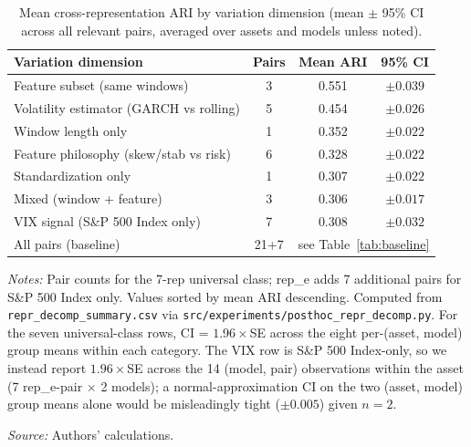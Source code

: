\documentclass[preprint,12pt,authoryear]{elsarticle}
\newcommand{\SPX}{S\&P 500 Index}
\begin{document}
\begin{table}[!htbp]
\centering
\small
\setlength{\tabcolsep}{5pt}
\caption{Mean cross-representation ARI by variation dimension (mean $\pm$ 95\% CI across all relevant pairs, averaged over assets and models unless noted).}
\label{tab:decomp}
\begin{tabular}{lccc}
\toprule
Variation dimension & Pairs & Mean ARI & 95\% CI \\
\midrule
Feature subset (same windows)           & 3 & 0.551 & $\pm 0.039$ \\
Volatility estimator (GARCH vs rolling) & 5 & 0.454 & $\pm 0.026$ \\
Window length only                      & 1 & 0.352 & $\pm 0.022$ \\
Feature philosophy (skew/stab vs risk)  & 6 & 0.328 & $\pm 0.022$ \\
Standardization only                    & 1 & 0.307 & $\pm 0.022$ \\
Mixed (window + feature)                & 3 & 0.306 & $\pm 0.017$ \\
VIX signal (\SPX{} only)                & 7 & 0.308 & $\pm 0.032$ \\
\midrule
All pairs (baseline)                    & 21+7 & \multicolumn{2}{c}{see Table~\ref{tab:baseline}} \\
\bottomrule
\end{tabular}
\par\medskip
\begin{minipage}{\linewidth}
\footnotesize
\textit{Notes:} Pair counts for the 7-rep universal class; rep\_e adds 7 additional pairs for \SPX{} only. Values sorted by mean ARI descending. Computed from \texttt{repr\_decomp\_summary.csv} via \texttt{src/experiments/posthoc\_repr\_decomp.py}. For the seven universal-class rows, CI = $1.96 \times$SE across the eight per-(asset, model) group means within each category. The VIX row is \SPX{}-only, so we instead report $1.96 \times$SE across the 14 (model, pair) observations within the asset (7 rep\_e-pair $\times$ 2 models); a normal-approximation CI on the two (asset, model) group means alone would be misleadingly tight ($\pm 0.005$) given $n=2$.

\textit{Source:} Authors' calculations.
\end{minipage}
\end{table}
\end{document}
